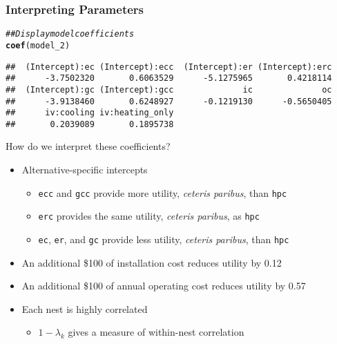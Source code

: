 \documentclass{beamer}\usepackage[]{graphicx}\usepackage[]{xcolor}
\makeatletter
\newcommand{\hlcom}[1]{\textcolor[rgb]{0.678,0.584,0.686}{\textit{#1}}}%
\newcommand{\hlstd}[1]{\textcolor[rgb]{0.345,0.345,0.345}{#1}}%
\newcommand{\hlkwd}[1]{\textcolor[rgb]{0.737,0.353,0.396}{\textbf{#1}}}%
\newenvironment{kframe}{%
 \def\at@end@of@kframe{}%
 \ifinner\ifhmode%
  \def\at@end@of@kframe{\end{minipage}}%
  \begin{minipage}{\columnwidth}%
 \fi\fi%
 \def\FrameCommand##1{\hskip\@totalleftmargin \hskip-\fboxsep
 \colorbox{shadecolor}{##1}\hskip-\fboxsep
     \hskip-\linewidth \hskip-\@totalleftmargin \hskip\columnwidth}%
 \MakeFramed {\advance\hsize-\width
   \@totalleftmargin\z@ \linewidth\hsize
   \@setminipage}}%
 {\par\unskip\endMakeFramed%
 \at@end@of@kframe}
\newenvironment{knitrout}{}{} %
\makeatother
\begin{document}
\begin{frame}[fragile]\frametitle{Interpreting Parameters}
\begin{knitrout}\footnotesize
{}\color{fgcolor}\begin{kframe}
\begin{alltt}
\hlcom{## Display model coefficients}
\hlkwd{coef}\hlstd{(model_2)}
\end{alltt}
\begin{verbatim}
##  (Intercept):ec (Intercept):ecc  (Intercept):er (Intercept):erc 
##      -3.7502320       0.6063529      -5.1275965       0.4218114 
##  (Intercept):gc (Intercept):gcc              ic              oc 
##      -3.9138460       0.6248927      -0.1219130      -0.5650405 
##      iv:cooling iv:heating_only 
##       0.2039089       0.1895738
\end{verbatim}
\end{kframe}
\end{knitrout}
    \vspace{2ex}
    How do we interpret these coefficients?
    \begin{itemize}
    	\item Alternative-specific intercepts
    	\begin{itemize}
    		\item \texttt{ecc} and \texttt{gcc} provide more utility, \emph{ceteris paribus}, than \texttt{hpc}
	      \item \texttt{erc} provides the same utility, \emph{ceteris paribus}, as \texttt{hpc}
	      \item \texttt{ec}, \texttt{er}, and \texttt{gc} provide less utility, \emph{ceteris paribus}, than \texttt{hpc}
    	\end{itemize}
        \item An additional \$100 of installation cost reduces utility by 0.12
        \item An additional \$100 of annual operating cost reduces utility by 0.57
        \item Each nest is highly correlated
        \begin{itemize}
        	\item $1 - \lambda_k$ gives a measure of within-nest correlation
        \end{itemize}
    \end{itemize}
\end{frame}
\end{document}

